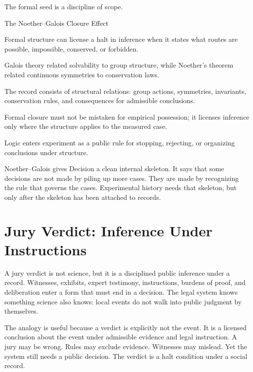 The formal seed is a discipline of scope.

\begin{phenom}{The Noether--Galois Closure Effect~\cite{noether1918,galois1846v6}}
\label{ph:noether-galois-closure}

\PhStatement
Formal structure can license a halt in inference when it states what routes
are possible, impossible, conserved, or forbidden.

\PhOrigin
Galois theory related solvability to group structure, while Noether's theorem
related continuous symmetries to conservation laws.

\PhObservation
The record consists of structural relations: group actions, symmetries,
invariants, conservation rules, and consequences for admissible conclusions.

\PhConstraint
Formal closure must not be mistaken for empirical possession; it licenses
inference only where the structure applies to the measured case.

\PhConsequence
Logic enters experiment as a public rule for stopping, rejecting, or
organizing conclusions under structure.
\end{phenom}

Noether--Galois gives Decision a clean internal skeleton. It says that some
decisions are not made by piling up more cases. They are made by recognizing
the rule that governs the cases. Experimental history needs that skeleton,
but only after the skeleton has been attached to records.

\section{Jury Verdict: Inference Under Instructions}

A jury verdict is not science, but it is a disciplined public inference under
a record. Witnesses, exhibits, expert testimony, instructions, burdens of
proof, and deliberation enter a form that must end in a decision. The legal
system knows something science also knows: local events do not walk into
public judgment by themselves.

The analogy is useful because a verdict is explicitly not the event. It is a
licensed conclusion about the event under admissible evidence and legal
instruction. A jury may be wrong. Rules may exclude evidence. Witnesses may
mislead. Yet the system still needs a public decision. The verdict is a halt
condition under a social record.

